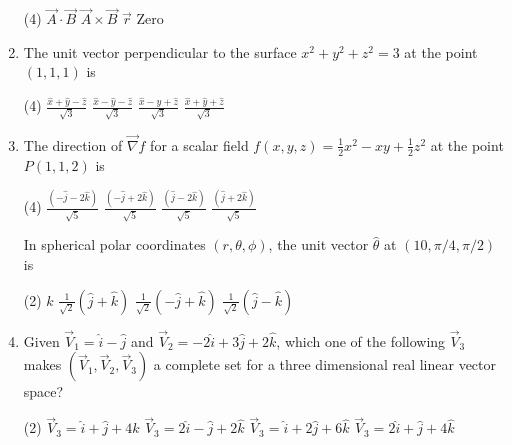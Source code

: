 \begin{enumerate}[label=\color{ocre}\textbf{\arabic*.}]
\begin{tasks}(4)
	\task[\textbf{A.}] $\vec{A} \cdot \vec{B}$
	\task[\textbf{B.}] $\vec{A} \times \vec{B}$
	\task[\textbf{C.}] $\vec{r}$
	\task[\textbf{D.}]  Zero
\end{tasks}
\item The unit vector perpendicular to the surface $x^{2}+y^{2}+z^{2}=3$ at the point $(1,1,1)$ is
{}

\begin{tasks}(4)
	\task[\textbf{A.}] $\frac{\hat{x}+\hat{y}-\hat{z}}{\sqrt{3}}$
	\task[\textbf{B.}] $\frac{\hat{x}-\hat{y}-\hat{z}}{\sqrt{3}}$
	\task[\textbf{C.}] $\frac{\hat{x}-\hat{y}+\hat{z}}{\sqrt{3}}$
	\task[\textbf{D.}] $\frac{\hat{x}+\hat{y}+\hat{z}}{\sqrt{3}}$
\end{tasks}
	\item The direction of $\vec{\nabla} f$ for a scalar field $f(x, y, z)=\frac{1}{2} x^{2}-x y+\frac{1}{2} z^{2}$ at the point $P(1,1,2)$ is
{}

\begin{tasks}(4)
	\task[\textbf{A.}] $\frac{(-\hat{j}-2 \hat{k})}{\sqrt{5}}$
	\task[\textbf{B.}] $\frac{(-\hat{j}+2 \hat{k})}{\sqrt{5}}$
	\task[\textbf{C.}] $\frac{(\hat{j}-2 \hat{k})}{\sqrt{5}}$
	\task[\textbf{D.}] $\frac{(\hat{j}+2 \hat{k})}{\sqrt{5}}$
\end{tasks}
\question In spherical polar coordinates $(r, \theta, \phi)$, the unit vector $\hat{\theta}$ at $(10, \pi / 4, \pi / 2)$ is
{}

\begin{tasks}(2)
	\task[\textbf{A.}] $\hat{k}$
	\task[\textbf{B.}] $\frac{1}{\sqrt{2}}(\hat{j}+\hat{k})$
	\task[\textbf{C.}]  $\frac{1}{\sqrt{2}}(-\hat{j}+\hat{k})$
	\task[\textbf{D.}] $\frac{1}{\sqrt{2}}(\hat{j}-\hat{k})$
\end{tasks}
\item Given $\vec{V}_{1}=\hat{i}-\hat{j}$ and $\vec{V}_{2}=-2 \hat{i}+3 \hat{j}+2 \hat{k}$, which one of the following $\vec{V}_{3}$ makes $\left(\vec{V}_{1}, \vec{V}_{2}, \vec{V}_{3}\right)$
a complete set for a three dimensional real linear vector space?
{}

\begin{tasks}(2)
	\task[\textbf{A.}] $\vec{V}_{3}=\hat{i}+\hat{j}+4 \hat{k}$
	\task[\textbf{B.}]  $\vec{V}_{3}=2 \hat{i}-\hat{j}+2 \hat{k}$
	\task[\textbf{C.}] $\vec{V}_{3}=\hat{i}+2 \hat{j}+6 \hat{k}$
	\task[\textbf{D.}] $\vec{V}_{3}=2 \hat{i}+\hat{j}+4 \hat{k}$
\end{tasks}
\end{enumerate}
